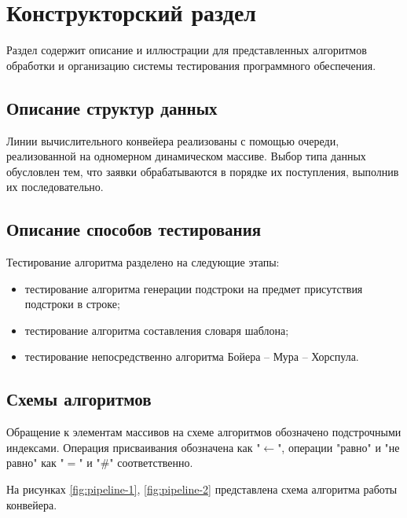 \chapter{Конструкторский раздел}\label{sec:design}

Раздел содержит описание и иллюстрации для представленных алгоритмов обработки и организацию системы тестирования программного обеспечения.

\section{Описание структур данных}
Линии вычислительного конвейера реализованы с помощью очереди\cite{queue}, реализованной на одномерном динамическом массиве. Выбор типа данных обусловлен тем, что заявки обрабатываются в порядке их поступления, выполнив их последовательно. 

\section{Описание способов тестирования}
Тестирование алгоритма разделено на следующие этапы: 
\begin{itemize}
	\item тестирование алгоритма генерации подстроки на предмет присутствия подстроки в строке;
	\item тестирование алгоритма составления словаря шаблона;
	\item тестирование непосредственно алгоритма Бойера -- Мура -- Хорспула.
\end{itemize} 

\section{Схемы алгоритмов}\label{sec:design-flowcharts}
Обращение к элементам массивов на схеме алгоритмов обозначено подстрочными индексами.
Операция присваивания обозначена как "$\leftarrow$", операции "равно" и "не равно" как "$=$" и "$\#$" соответственно. \newline

На рисунках \ref{fig:pipeline-1}, \ref{fig:pipeline-2} представлена схема алгоритма работы конвейера. 

